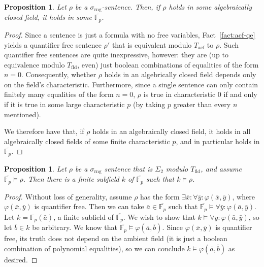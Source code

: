 \documentclass{article}
\theoremstyle{plain}
\newtheorem{prop}[thm]{Proposition}
\theoremstyle{definition}
\newcommand{\ringsig}{\sigma_{\operatorname{rng}}}
\newcommand{\fieldthy}{T_{\operatorname{fld}}}
\newcommand{\acf}{T_{\operatorname{acf}}}
\newcommand{\tuple}{\bar}
\renewcommand{\phi}{\varphi}
\begin{document}
\begin{prop}\label{prop:anything-goestofinitecharacteristic}
  Let $\rho$ be a $\ringsig$-sentence. Then, if $\rho$ holds in some
  algebraically closed field, it holds in some
  $\overline{\mathbb{F}_p}$.
\end{prop}
\begin{proof}
  Since a sentence is just a formula with no free variables,
  Fact~\ref{fact:acf-qe} yields a quantifier free sentence $\rho'$
  that is equivalent modulo $\acf$ to $\rho$. Such quantifier free
  sentences are quite inexpressive, however: they are (up to
  equivalence modulo $\fieldthy$, even) just boolean combinations of
  equalities of the form $n = 0$. Consequently, whether $\rho$ holds
  in an algebrically closed field depends only on the field's
  characteristic. Furthermore, since a single sentence can only
  contain finitely many equalities of the form $n = 0$, $\rho$ is true
  in characteristic 0 if and only if it is true in some large
  characteristic $p$ (by taking $p$ greater than every $n$ mentioned).

  We therefore have that, if $\rho$ holds in an algebraically closed
  field, it holds in all algebraically closed fields of some finite
  characteristic $p$, and in particular holds in
  $\overline{\mathbb{F}_p}$.
\end{proof}

\begin{prop}\label{prop:sig2-goestofinitefield}
  Let $\rho$ be a $\ringsig$ sentence that is $\Sigma_2$ modulo
  $\fieldthy$, and assume $\overline{\mathbb{F}_p} \models \rho$. Then
  there is a finite subfield $k$ of $\overline{\mathbb{F}_p}$ such
  that $k \models \rho$.
\end{prop}
\begin{proof}
  Without loss of generality, assume $\rho$ has the form $\exists
  \tuple{x} : \forall \tuple{y} : \phi(\tuple{x},\tuple{y})$, where
  $\phi(\tuple{x},\tuple{y})$ is quantifier free. Then we can take
  $\tuple{a} \in \overline{\mathbb{F}_p}$ such that
  $\overline{\mathbb{F}_p} \models \forall \tuple{y}:
  \phi(\tuple{a},\tuple{y})$. Let $k = \mathbb{F}_p(\tuple{a})$, a
  finite subfield of $\overline{\mathbb{F}_p}$. We wish to show that
  $k \models \forall y: \phi(\tuple{a},\tuple{y})$, so let $\tuple{b}
  \in k$ be arbitrary. We know that $\overline{\mathbb{F}_p} \models
  \phi(\tuple{a},\tuple{b})$. Since $\phi(\tuple{x},\tuple{y})$ is
  quantifier free, its truth does not depend on the ambient field (it
  is just a boolean combination of polynomial equalities), so we can
  conclude $k \models \phi(\tuple{a},\tuple{b})$ as desired.
\end{proof}
\end{document}
